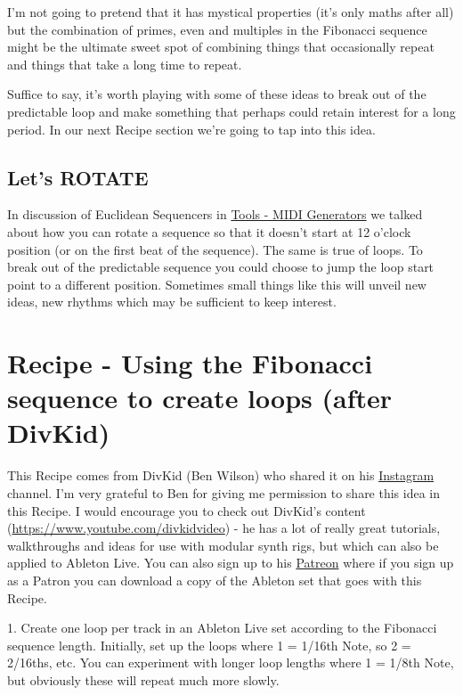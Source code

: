 \documentclass[
  12pt,
  letterpaper,
  oneside,
  open=any]{scrbook}
\begin{document}
I'm not going to pretend that it has mystical properties (it's only
maths after all) but the combination of primes, even and multiples in
the Fibonacci sequence might be the ultimate sweet spot of combining
things that occasionally repeat and things that take a long time to
repeat.

Suffice to say, it's worth playing with some of these ideas to break out
of the predictable loop and make something that perhaps could retain
interest for a long period. In our next Recipe section we're going to
tap into this idea.

\section{Let's ROTATE}\label{lets-rotate}

In discussion of Euclidean Sequencers in
\hyperref[012-Tools-MIDI_Generators]{Tools - MIDI Generators} we talked
about how you can rotate a sequence so that it doesn't start at 12
o'clock position (or on the first beat of the sequence). The same is
true of loops. To break out of the predictable sequence you could choose
to jump the loop start point to a different position. Sometimes small
things like this will unveil new ideas, new rhythms which may be
sufficient to keep interest.


\chapter{Recipe - Using the Fibonacci sequence to create loops (after
DivKid)}\label{022-Recipe-Fibonacci_loops}

This Recipe comes from DivKid (Ben Wilson) who shared it on his
\href{https://www.instagram.com/divkidvideo}{Instagram} channel. I'm
very grateful to Ben for giving me permission to share this idea in this
Recipe. I would encourage you to check out DivKid's content
(\url{https://www.youtube.com/divkidvideo}) - he has a lot of really
great tutorials, walkthroughs and ideas for use with modular synth rigs,
but which can also be applied to Ableton Live. You can also sign up to
his \href{https://www.patreon.com/DivKid}{Patreon} where if you sign up
as a Patron you can download a copy of the Ableton set that goes with
this Recipe.

1. Create one loop per track in an Ableton Live set according to the
Fibonacci sequence length. Initially, set up the loops where 1 = 1/16th
Note, so 2 = 2/16ths, etc. You can experiment with longer loop lengths
where 1 = 1/8th Note, but obviously these will repeat much more slowly.
\end{document}
